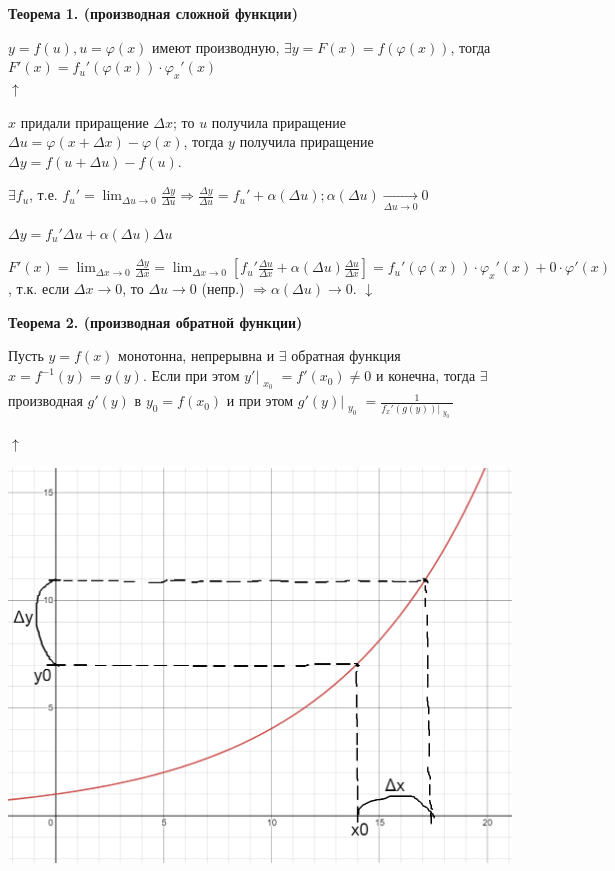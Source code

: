 \documentclass{article}
\begin{document}
    \textbf{Теорема 1. (производная сложной функции)}

    \( y = f(u), u = \varphi(x) \) имеют производную, \( \exists y= F(x) = f(\varphi(x)) \), тогда \( F'(x) = f_u'(\varphi(x)) \cdot \varphi_x'(x) \)\\
    \( \uparrow \)
    
    \(x\) придали приращение \(\Delta x\); то \(u\) получила приращение \(\Delta u = \varphi(x + \Delta x) - \varphi(x)\), тогда \(y\) получила приращение \(\Delta y = f(u + \Delta u) - f(u) \).
    
    \(\exists f_u\), т.е. \( f_u' = \lim_{\Delta u \to 0} \frac{\Delta y}{\Delta u} \Rightarrow \frac{\Delta y}{\Delta u} = f_u' + \alpha(\Delta u); \alpha(\Delta u) \xrightarrow[\Delta u \to 0]{} 0\)
    
    \(\Delta y = f_u'\Delta u + \alpha(\Delta u)\Delta u\)

    \( F'(x) = \lim_{\Delta x \to 0}\frac{\Delta y}{\Delta x} = \lim_{\Delta x \to 0} [f_u'\frac{\Delta u}{\Delta x} + \alpha(\Delta u)\frac{\Delta u}{\Delta x}] = f_u'(\varphi(x)) \cdot \varphi_x'(x) + 0 \cdot \varphi'(x) \), т.к. если \( \Delta x \to 0 \), то \(\Delta u \to 0\) (непр.) \( \Rightarrow \alpha(\Delta u) \to 0 \).
    \(\downarrow\)

    \textbf{Теорема 2. (производная обратной функции)}

    Пусть \( y = f(x) \) монотонна, непрерывна и \(\exists\) обратная функция \( x = f^{-1}(y) = g(y) \). Если при этом \(y'\Bigr|_{\substack{x_0}} = f'(x_0) \neq 0\) и конечна, тогда \(\exists\) производная \( g'(y) \) в \(y_0 = f(x_0)\) и при этом \(g'(y)\Bigr|_{\substack{y_0}} = \frac{1}{f_x'(g(y))\Bigr|_{\substack{y_0}}} \)

    \(\uparrow\)
    
    \includegraphics[scale=0.3]{11_1_9_1.png}
\end{document}
